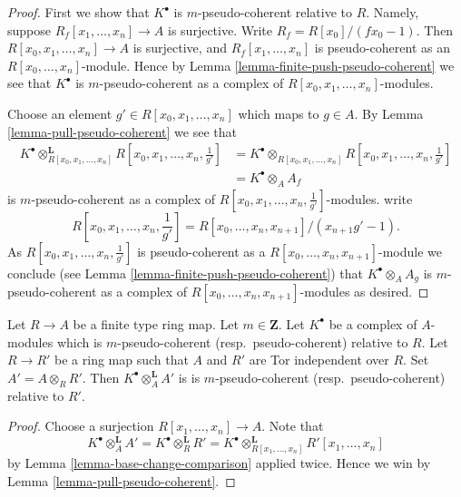 \begin{proof}
First we show that $K^\bullet$ is $m$-pseudo-coherent relative to $R$.
Namely, suppose $R_f[x_1, \ldots, x_n] \to A$ is surjective. Write
$R_f = R[x_0]/(fx_0 - 1)$. Then $R[x_0, x_1, \ldots, x_n] \to A$
is surjective, and $R_f[x_1, \ldots, x_n]$ is pseudo-coherent as
an $R[x_0, \ldots, x_n]$-module. Hence by
Lemma \ref{lemma-finite-push-pseudo-coherent}
we see that $K^\bullet$ is $m$-pseudo-coherent as a complex of
$R[x_0, x_1, \ldots, x_n]$-modules.

\medskip\noindent
Choose an element $g' \in R[x_0, x_1, \ldots, x_n]$ which maps to $g \in A$. By
Lemma \ref{lemma-pull-pseudo-coherent}
we see that
\begin{align*}
K^\bullet \otimes_{R[x_0, x_1, \ldots, x_n]}^{\mathbf{L}}
R[x_0, x_1, \ldots, x_n, \frac{1}{g'}] & =
K^\bullet \otimes_{R[x_0, x_1, \ldots, x_n]}
R[x_0, x_1, \ldots, x_n, \frac{1}{g'}] \\
& = K^\bullet \otimes_A A_f
\end{align*}
is $m$-pseudo-coherent as a complex of
$R[x_0, x_1, \ldots, x_n, \frac{1}{g'}]$-modules.
write
$$
R[x_0, x_1, \ldots, x_n, \frac{1}{g'}] =
R[x_0, \ldots, x_n, x_{n + 1}]/(x_{n + 1}g' - 1).
$$
As $R[x_0, x_1, \ldots, x_n, \frac{1}{g'}]$ is pseudo-coherent as a
$R[x_0, \ldots, x_n, x_{n + 1}]$-module we conclude (see
Lemma \ref{lemma-finite-push-pseudo-coherent})
that $K^\bullet \otimes_A A_g$ is $m$-pseudo-coherent as a complex of
$R[x_0, \ldots, x_n, x_{n + 1}]$-modules as desired.
\end{proof}

\begin{lemma}
\label{lemma-base-change-relative-pseudo-coherent}
Let $R \to A$ be a finite type ring map. Let $m \in \mathbf{Z}$.
Let $K^\bullet$ be a complex of $A$-modules which is $m$-pseudo-coherent
(resp.\ pseudo-coherent) relative to $R$. Let $R \to R'$ be a ring
map such that $A$ and $R'$ are Tor independent over $R$. Set
$A' = A \otimes_R R'$. Then
$K^\bullet \otimes_A^{\mathbf{L}} A'$ is
is $m$-pseudo-coherent (resp.\ pseudo-coherent) relative to $R'$.
\end{lemma}

\begin{proof}
Choose a surjection $R[x_1, \ldots, x_n] \to A$.
Note that
$$
K^\bullet \otimes_A^{\mathbf{L}} A' =
K^\bullet \otimes_R^{\mathbf{L}} R' =
K^\bullet \otimes_{R[x_1, \ldots, x_n]}^{\mathbf{L}} R'[x_1, \ldots, x_n]
$$
by
Lemma \ref{lemma-base-change-comparison}
applied twice. Hence we win by
Lemma \ref{lemma-pull-pseudo-coherent}.
\end{proof}

